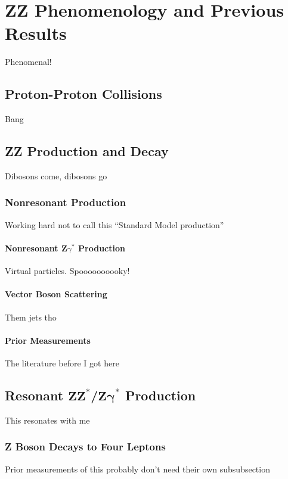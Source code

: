 \chapter{ZZ Phenomenology and Previous Results}
Phenomenal!

\section{Proton-Proton Collisions}
Bang



\section{ZZ Production and Decay}
Dibosons come, dibosons go

\subsection{Nonresonant Production}
Working hard not to call this ``Standard Model production''

\subsubsection{Nonresonant
               \texorpdfstring{$\mathbf{Z}\gamma^\ast$}{Zgamma*}
               Production}
Virtual particles. Spoooooooooky!

\subsubsection{Vector Boson Scattering}
Them jets tho

\subsubsection{Prior Measurements}
The literature before I got here


\section{Resonant
         \texorpdfstring{$\mathbf{ZZ}^\ast$/$\mathbf{Z\gamma}^\ast$}
         {ZZ*/Zgamma*}
         Production
         }
This resonates with me

\subsection{Z Boson Decays to Four Leptons}
Prior measurements of this probably don't need their own subsubsection


